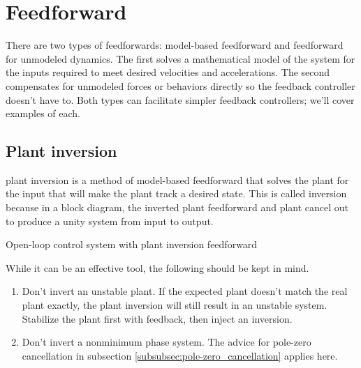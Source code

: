 \section{Feedforward}

There are two types of feedforwards: model-based feedforward and feedforward for
unmodeled dynamics. The first solves a mathematical model of the system for the
inputs required to meet desired velocities and accelerations. The second
compensates for unmodeled forces or behaviors directly so the feedback
controller doesn't have to. Both types can facilitate simpler feedback
controllers; we'll cover examples of each.

\subsection{Plant inversion}
\label{subsec:plant_inversion}

\Gls{plant} inversion is a method of model-based feedforward that solves the
\gls{plant} for the input that will make the \gls{plant} track a desired state.
This is called inversion because in a block diagram, the inverted \gls{plant}
feedforward and \gls{plant} cancel out to produce a unity system from input to
output.
\begin{bookfigure}

  \caption{Open-loop control system with plant inversion feedforward}
\end{bookfigure}

While it can be an effective tool, the following should be kept in mind.
\begin{enumerate}
  \item Don't invert an unstable \gls{plant}. If the expected \gls{plant}
    doesn't match the real \gls{plant} exactly, the \gls{plant} inversion will
    still result in an unstable \gls{system}. Stabilize the \gls{plant} first
    with feedback, then inject an inversion.
  \item Don't invert a nonminimum phase system. The advice for pole-zero
    cancellation in subsection \ref{subsubsec:pole-zero_cancellation} applies
    here.
\end{enumerate}

